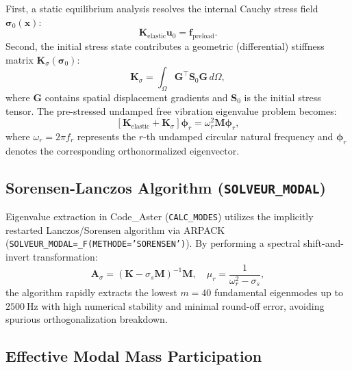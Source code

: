 First, a static equilibrium analysis resolves the internal Cauchy stress field $\boldsymbol{\sigma}_0(\mathbf{x})$:
\begin{equation}
\mathbf{K}_{\text{elastic}} \mathbf{u}_0 = \mathbf{f}_{\text{preload}}.
\label{eq:static_preload}
\end{equation}
Second, the initial stress state contributes a geometric (differential) stiffness matrix $\mathbf{K}_\sigma(\boldsymbol{\sigma}_0)$:
\begin{equation}
\mathbf{K}_\sigma = \int_\Omega \mathbf{G}^\top \mathbf{S}_0 \mathbf{G} \, d\Omega,
\label{eq:k_sigma}
\end{equation}
where $\mathbf{G}$ contains spatial displacement gradients and $\mathbf{S}_0$ is the initial stress tensor. The pre-stressed undamped free vibration eigenvalue problem becomes:
\begin{equation}
\left[ \mathbf{K}_{\text{elastic}} + \mathbf{K}_\sigma \right] \boldsymbol{\phi}_r = \omega_r^2 \mathbf{M} \boldsymbol{\phi}_r,
\label{eq:prestressed_eigen}
\end{equation}
where $\omega_r = 2\pi f_r$ represents the $r$-th undamped circular natural frequency and $\boldsymbol{\phi}_r$ denotes the corresponding orthonormalized eigenvector.

\subsection{Sorensen-Lanczos Algorithm (\texttt{SOLVEUR\_MODAL})}

Eigenvalue extraction in Code\_Aster (\texttt{CALC\_MODES}) utilizes the implicitly restarted Lanczos/Sorensen algorithm \cite{sorensen1992,lanczos1950} via ARPACK (\texttt{SOLVEUR\_MODAL=\_F(METHODE='SORENSEN')}). By performing a spectral shift-and-invert transformation:
\begin{equation}
\mathbf{A}_\sigma = \left( \mathbf{K} - \sigma_s \mathbf{M} \right)^{-1} \mathbf{M}, \quad \mu_r = \frac{1}{\omega_r^2 - \sigma_s},
\label{eq:shift_invert}
\end{equation}
the algorithm rapidly extracts the lowest $m = 40$ fundamental eigenmodes up to $\SI{2500}{\hertz}$ with high numerical stability and minimal round-off error, avoiding spurious orthogonalization breakdown.

\subsection{Effective Modal Mass Participation}

